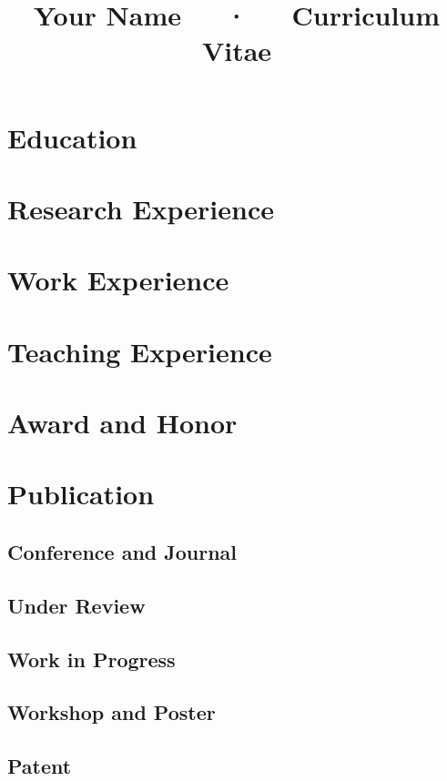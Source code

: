\documentclass{modularcv}
\title{Your Name~~~·~~~Curriculum Vitae}
\begin{document}
\makecvheader
\makefooter

\section{Education}
\makeEducation

\section{Research Experience}
\makeResearchExperience

\section{Work Experience}
\makeWorkExperience

\section{Teaching Experience}
\makeTeaching

\section{Award and Honor}
\makeAward

\section{Publication}
\subsection{Conference and Journal}

\subsection{Under Review}

\subsection{Work in Progress}

\subsection{Workshop and Poster}

\subsection{Patent}
\end{document}
